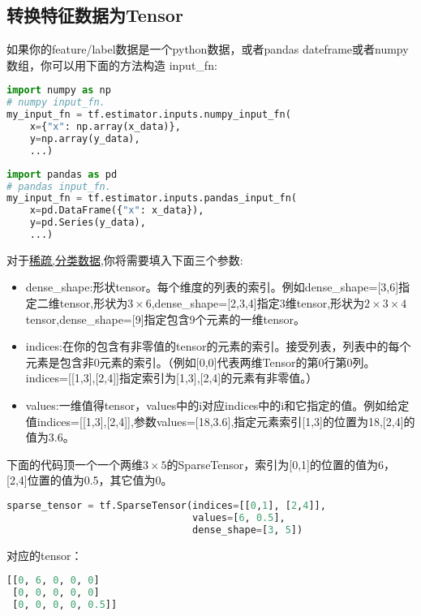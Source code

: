 \subsection{转换特征数据为Tensor}
如果你的feature/label数据是一个python数据，或者pandas dateframe或者numpy数组，你可以用下面的方法构造
input\_fn:
\begin{lstlisting}[language=Python]
import numpy as np
# numpy input_fn.
my_input_fn = tf.estimator.inputs.numpy_input_fn(
    x={"x": np.array(x_data)},
    y=np.array(y_data),
    ...)
\end{lstlisting}
\begin{lstlisting}[language=Python]
import pandas as pd
# pandas input_fn.
my_input_fn = tf.estimator.inputs.pandas_input_fn(
    x=pd.DataFrame({"x": x_data}),
    y=pd.Series(y_data),
    ...)
\end{lstlisting}
对于\href{https://en.wikipedia.org/wiki/Sparse_matrix}{稀疏,分类数据},你将需要填入下面三个参数:
\begin{itemize}
    \item dense\_shape:形状tensor。每个维度的列表的索引。例如dense\_shape=[3,6]指定二维tensor,形状为$3\times6$,dense\_shape=[2,3,4]指定3维tensor,形状为$2\times3\times4$tensor,dense\_shape=[9]指定包含9个元素的一维tensor。
    \item indices:在你的包含有非零值的tensor的元素的索引。接受列表，列表中的每个元素是包含非0元素的索引。（例如[0,0]代表两维Tensor的第0行第0列。indices=[[1,3],[2,4]]指定索引为[1,3],[2,4]的元素有非零值。）
    \item values:一维值得tensor，values中的i对应indices中的i和它指定的值。例如给定值indices=[[1,3],[2,4]],参数values=[18,3.6],指定元素索引[1,3]的位置为18,[2,4]的值为3.6。
\end{itemize}
下面的代码顶一个一个两维$3\times5$的SparseTensor，索引为[0,1]的位置的值为6，[2,4]位置的值为0.5，其它值为0。
\begin{lstlisting}[language=Python]
sparse_tensor = tf.SparseTensor(indices=[[0,1], [2,4]],
                                values=[6, 0.5],
                                dense_shape=[3, 5])
\end{lstlisting}
对应的tensor：
\begin{lstlisting}[language=Python]
[[0, 6, 0, 0, 0]
 [0, 0, 0, 0, 0]
 [0, 0, 0, 0, 0.5]]
\end{lstlisting}
